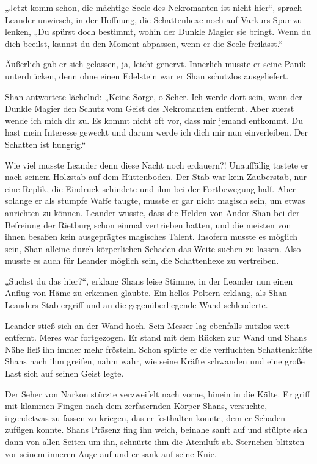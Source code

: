 „Jetzt komm schon, die mächtige Seele des Nekromanten ist nicht hier“, sprach Leander unwirsch, in der Hoffnung, die Schattenhexe noch auf Varkurs Spur zu lenken, „Du spürst doch bestimmt, wohin der Dunkle Magier sie bringt. Wenn du dich beeilst, kannst du den Moment abpassen, wenn er die Seele freilässt.“

Äußerlich gab er sich gelassen, ja, leicht genervt. Innerlich musste er seine Panik unterdrücken, denn ohne einen Edelstein war er Shan schutzlos ausgeliefert.

Shan antwortete lächelnd: „Keine Sorge, o Seher. Ich werde dort sein, wenn der Dunkle Magier den Schutz vom Geist des Nekromanten entfernt. Aber zuerst wende ich mich dir zu. Es kommt nicht oft vor, dass mir jemand entkommt. Du hast mein Interesse geweckt und darum werde ich dich mir nun einverleiben. Der Schatten ist hungrig.“

Wie viel musste Leander denn diese Nacht noch erdauern?! Unauffällig tastete er nach seinem Holzstab auf dem Hüttenboden. Der Stab war kein Zauberstab, nur eine Replik, die Eindruck schindete und ihm bei der Fortbewegung half. Aber solange er als stumpfe Waffe taugte, musste er gar nicht magisch sein, um etwas anrichten zu können. Leander wusste, dass die Helden von Andor Shan bei der Befreiung der Rietburg schon einmal vertrieben hatten, und die meisten von ihnen besaßen kein ausgeprägtes magisches Talent. Insofern musste es möglich sein, Shan alleine durch körperlichen Schaden das Weite suchen zu lassen. Also musste es auch für Leander möglich sein, die Schattenhexe zu vertreiben.

„Suchst du das hier?“, erklang Shans leise Stimme, in der Leander nun einen Anflug von Häme zu erkennen glaubte. Ein helles Poltern erklang, als Shan Leanders Stab ergriff und an die gegenüberliegende Wand schleuderte.

Leander stieß sich an der Wand hoch. Sein Messer lag ebenfalls nutzlos weit entfernt. Meres war fortgezogen. Er stand mit dem Rücken zur Wand und Shans Nähe ließ ihn immer mehr frösteln. Schon spürte er die verfluchten Schattenkräfte Shans nach ihm greifen, nahm wahr, wie seine Kräfte schwanden und eine große Last sich auf seinen Geist legte.

Der Seher von Narkon stürzte verzweifelt nach vorne, hinein in die Kälte. Er griff mit klammen Fingen nach dem zerfasernden Körper Shans, versuchte, irgendetwas zu fassen zu kriegen, das er festhalten konnte, dem er Schaden zufügen konnte. Shans Präsenz fing ihn weich, beinahe sanft auf und stülpte sich dann von allen Seiten um ihn, schnürte ihm die Atemluft ab. Sternchen blitzten vor seinem inneren Auge auf und er sank auf seine Knie.


